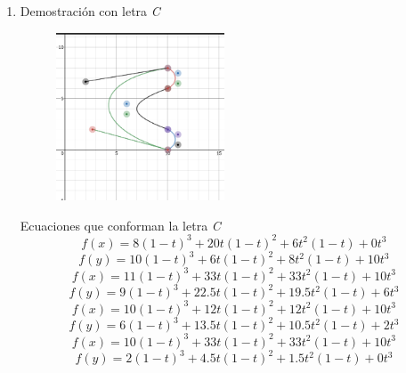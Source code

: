 \documentclass[11pt]{article}
\begin{document}
\begin{enumerate}
\item 
Demostración con letra \emph{C}
\begin{center}
	\begin{figure}[h!]
		\centering
		\includegraphics[width=50mm]{LetraCC.png}
	\end{figure}
\end{center}
Ecuaciones que conforman la letra \emph{C}
\begin{equation}
f(x) = 8(1-t)^3 + 20t(1-t)^2 + 6t^2(1-t)+ 0t^3 
\end{equation}
\begin{equation}
f(y) = 10(1-t)^3 + 6t(1-t)^2 + 8t^2(1-t)+ 10t^3 
\end{equation}
\begin{equation}
f(x) = 11(1-t)^3 + 33t(1-t)^2 +33t^2(1-t)+ 10t^3 
\end{equation}
\begin{equation}
f(y) = 9(1-t)^3 + 22.5t(1-t)^2 + 19.5t^2(1-t)+ 6t^3 
\end{equation}
\begin{equation}
f(x) = 10(1-t)^3 + 12t(1-t)^2 + 12t^2(1-t)+ 10t^3 
\end{equation}
\begin{equation}
f(y) = 6(1-t)^3 + 13.5t(1-t)^2 + 10.5t^2(1-t)+ 2t^3 
\end{equation}
\begin{equation}
f(x) = 10(1-t)^3 + 33t(1-t)^2 + 33t^2(1-t)+ 10t^3 
\end{equation}
\begin{equation}
f(y) = 2(1-t)^3 + 4.5t(1-t)^2 + 1.5t^2(1-t)+ 0t^3 
\end{equation}


\end{enumerate}
\end{document}
